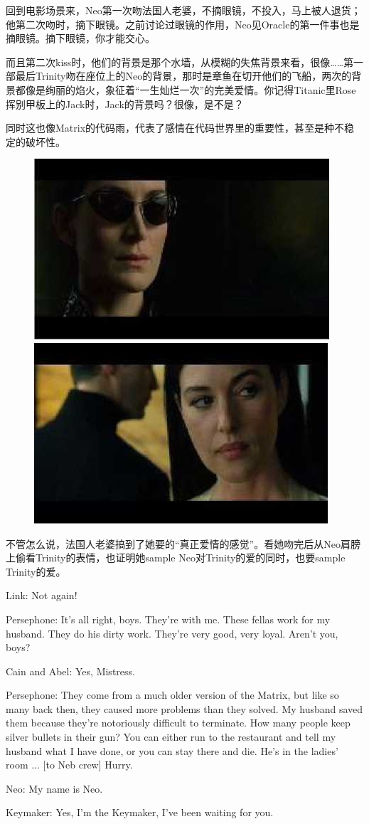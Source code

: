 \documentclass{ctexart}
\newenvironment{myquote}{\color{green} \setlength{\leftskip}{6em} \setlength{\rightskip}{4em} \setlength{\parindent}{-2em}}{\par}
\begin{document}
回到电影场景来，Neo第一次吻法国人老婆，不摘眼镜，不投入，马上被人退货；他第二次吻时，摘下眼镜。之前讨论过眼镜的作用，Neo见Oracle的第一件事也是摘眼镜。摘下眼镜，你才能交心。

而且第二次kiss时，他们的背景是那个水墙，从模糊的失焦背景来看，很像……第一部最后Trinity吻在座位上的Neo的背景，那时是章鱼在切开他们的飞船，两次的背景都像是绚丽的焰火，象征着“一生灿烂一次”的完美爱情。你记得Titanic里Rose挥别甲板上的Jack时，Jack的背景吗？很像，是不是？

同时这也像Matrix的代码雨，代表了感情在代码世界里的重要性，甚至是种不稳定的破坏性。

\begin{figure}[htb]
\centering
\includegraphics[width=0.45\linewidth]{fig/read_reloaded-107}
\includegraphics[width=0.45\linewidth]{fig/read_reloaded-107-1}
\end{figure}

不管怎么说，法国人老婆搞到了她要的“真正爱情的感觉”。看她吻完后从Neo肩膀上偷看Trinity的表情，也证明她sample Neo对Trinity的爱的同时，也要sample Trinity的爱。

\begin{myquote}
Link: Not again!

Persephone: It's all right, boys. They're with me. These fellas work for my husband. They do his dirty work. They're very good, very loyal. Aren't you, boys?

Cain and Abel: Yes, Mistress.

Persephone: They come from a much older version of the Matrix, but like so many back then, they caused more problems than they solved. My husband saved them because they're notoriously difficult to terminate. How many people keep silver bullets in their gun? You can either run to the restaurant and tell my husband what I have done, or you can stay there and die. He's in the ladies' room ... [to Neb crew] Hurry.

Neo: My name is Neo.

Keymaker: Yes, I'm the Keymaker, I've been waiting for you.
\end{myquote}
\end{document}
